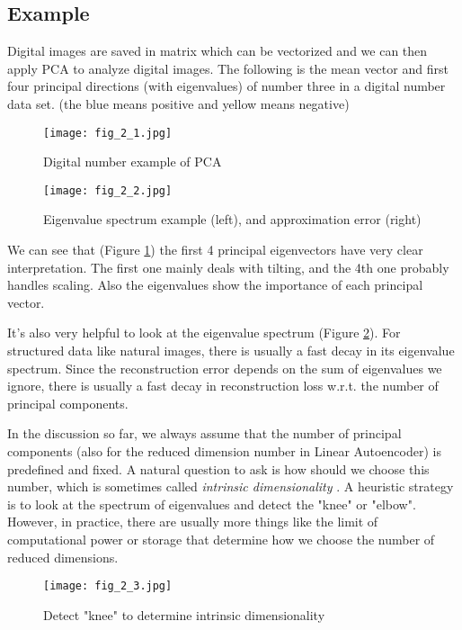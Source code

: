 \documentclass[../book-template.tex]{subfiles}
\begin{document}
\subsection{Example}
Digital images are saved in matrix which can be vectorized and we can then apply PCA to analyze digital images. The following is the mean vector and first four principal directions (with eigenvalues) of number three in a digital number data set. (the blue means positive and yellow means negative)
\begin{figure}[h]
    \centering 
    \texttt{[image: fig\_2\_1.jpg]} 
    \caption{Digital number example of PCA}\label{fig_2_1}
\end{figure}
\begin{figure}[h] 
    \centering 
    \texttt{[image: fig\_2\_2.jpg]} 
    \caption{Eigenvalue spectrum example (left), and approximation error (right)}\label{fig_2_2}
\end{figure}
\par We can see that (Figure \ref{fig_2_1}) the first 4 principal eigenvectors have very clear interpretation. The first one mainly deals with tilting, and the 4th one probably handles scaling. Also the eigenvalues show the importance of each principal vector.
\par It's also very helpful to look at the eigenvalue spectrum (Figure \ref{fig_2_2}). For structured data like natural images, there is usually a fast decay in its eigenvalue spectrum. Since the reconstruction error depends on the sum of eigenvalues we ignore, there is usually a fast decay in reconstruction loss w.r.t. the number of principal components.
\par In the discussion so far, we always assume that the number of principal components (also for the reduced dimension number in Linear Autoencoder) is predefined and fixed. A natural question to ask is how should we choose this number, which is sometimes called \emph{intrinsic dimensionality} . A heuristic strategy is to look at the spectrum of eigenvalues and detect the "knee" or "elbow". However, in practice, there are usually more things like the limit of computational power or storage that determine how we choose the number of reduced dimensions.
\begin{figure}[h] 
    \centering 
    \texttt{[image: fig\_2\_3.jpg]} 
    \caption{Detect "knee" to determine intrinsic dimensionality}\label{fig_2_3}
\end{figure}
\end{document}
